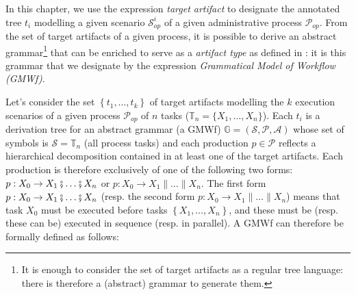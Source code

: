\label{chap3:sec:target-artifacts-and-gmwf}
In this chapter, we use the expression \textit{target artifact} to designate the annotated tree $t_i$ modelling a given scenario $\mathcal{S}_{op}^i$ of a given administrative process $\mathcal{P}_{op}$. From the set of target artifacts of a given process, it is possible to derive an abstract grammar\footnote{It is enough to consider the set of target artifacts as a regular tree language: there is therefore a (abstract) grammar to generate them.} that can be enriched to serve as a \textit{artifact type} as defined in \cite{hull2009facilitating}: it is this grammar that we designate by the expression \textit{Grammatical Model of Workflow (GMWf)}.

Let's consider the set $\left\{t_1,\ldots,t_k\right\}$ of target artifacts modelling the $k$ execution scenarios of a given process $\mathcal{P}_{op}$ of $n$ tasks ($\mathbb{T}_n = \{X_1, \ldots, X_n\}$). Each $t_i$ is a derivation tree for an abstract grammar (a GMWf) $\mathbb{G}=\left(\mathcal{S},\mathcal{P},\mathcal{A}\right)$ whose set of symbols is $\mathcal{S}=\mathbb{T}_n$ (all process tasks) and each production $p \in \mathcal{P}$ reflects a hierarchical decomposition contained in at least one of the target artifacts. Each production is therefore exclusively of one of the following two forms: $p: X_0 \rightarrow X_1 \fatsemi \ldots \fatsemi X_n$ or  $p: X_0 \rightarrow X_1 \parallel \ldots \parallel X_n$. The first form $p: X_0 \rightarrow X_1 \fatsemi \ldots \fatsemi X_n$ (resp. the second form $p: X_0 \rightarrow X_1 \parallel \ldots \parallel X_n$) means that task $X_0$ must be executed before tasks $\left\{X_1,\ldots,X_n\right\}$, and these must be (resp. these can be) executed in sequence (resp. in parallel). A GMWf can therefore be formally defined as follows:
